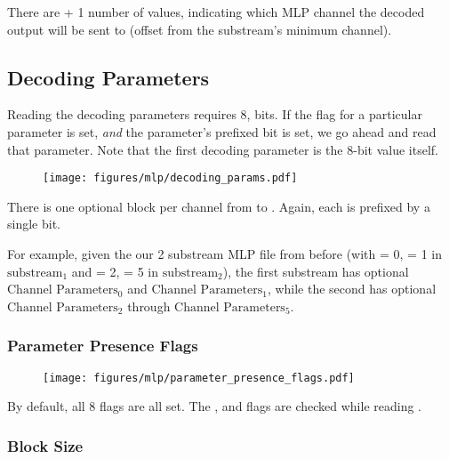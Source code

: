 There are  + 1 number of 
values, indicating which MLP channel the decoded output will be sent to
(offset from the substream's minimum channel).

\clearpage

\subsection{Decoding Parameters}

Reading the decoding parameters requires 8,
 bits.
If the flag for a particular parameter is set,
\textit{and} the parameter's prefixed 
bit is set, we go ahead and read that parameter.
Note that the first decoding parameter is the 8-bit
 value itself.

\begin{figure}[h]
\texttt{[image: figures/mlp/decoding\_params.pdf]}
\end{figure}
\par
\noindent
There is one optional  block per
channel from  to .
Again, each is prefixed by a single  bit.

For example, given the our 2 substream MLP file from before
(with  = 0,  = 1 in $\text{substream}_1$
and  = 2,  = 5 in $\text{substream}_2$),
the first substream has optional $\text{Channel Parameters}_0$
and $\text{Channel Parameters}_1$, while the second has
optional $\text{Channel Parameters}_2$ through $\text{Channel Parameters}_5$.

\subsubsection{Parameter Presence Flags}

\begin{figure}[h]
\texttt{[image: figures/mlp/parameter\_presence\_flags.pdf]}
\end{figure}
\par
\noindent
By default, all 8 flags are all set.
The ,  and
 flags are checked while
reading .

\subsubsection{Block Size}

